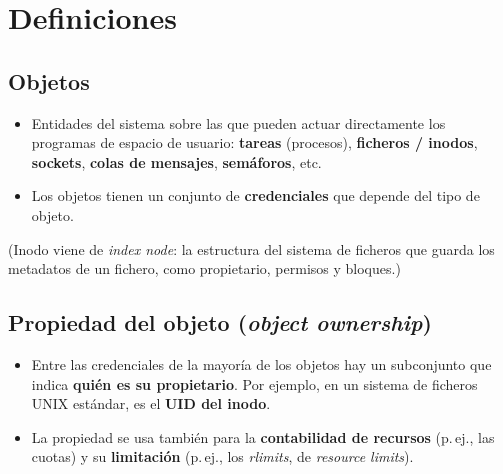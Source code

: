 \documentclass[11pt,a4paper]{report}
\begin{document}
\begin{center}
\end{center}
 
\section{Definiciones}
 
\subsection{Objetos}
\begin{itemize}
  \item Entidades del sistema sobre las que pueden actuar directamente los programas de espacio de usuario: \textbf{tareas} (procesos), \textbf{ficheros / inodos}, \textbf{sockets}, \textbf{colas de mensajes}, \textbf{semáforos}, etc.
  \item Los objetos tienen un conjunto de \textbf{credenciales} que depende del tipo de objeto.
\end{itemize}
(Inodo viene de \emph{index node}: la estructura del sistema de ficheros que guarda los metadatos de un fichero, como propietario, permisos y bloques.)
 
\subsection{Propiedad del objeto (\emph{object ownership})}
\begin{itemize}
  \item Entre las credenciales de la mayoría de los objetos hay un subconjunto que indica \textbf{quién es su propietario}. Por ejemplo, en un sistema de ficheros UNIX estándar, es el \textbf{UID del inodo}.
  \item La propiedad se usa también para la \textbf{contabilidad de recursos} (p.\,ej., las cuotas) y su \textbf{limitación} (p.\,ej., los \emph{rlimits}, de \emph{resource limits}).
\end{itemize}
 
\end{document}
